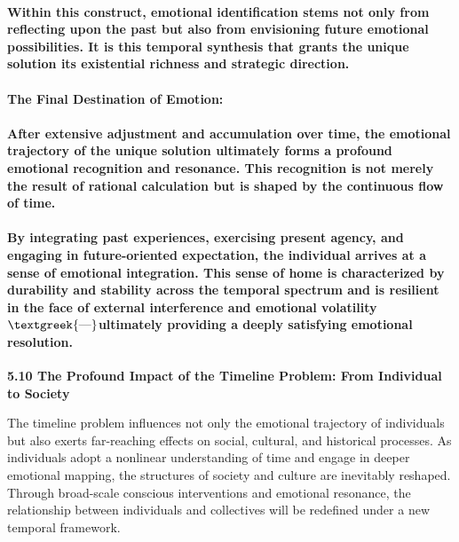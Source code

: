 \documentclass[a4paper]{article}
\begin{document}
\paragraph{Within this construct, emotional identification stems not only from reflecting upon the past but also from
envisioning future emotional possibilities. It is this temporal synthesis that grants the unique solution its
existential richness and strategic direction.}
\paragraph[The Final Destination of Emotion:]{\textbf{The Final Destination of Emotion:}}
\paragraph{After extensive adjustment and accumulation over time, the emotional trajectory of the unique solution
ultimately forms a profound emotional recognition and resonance. This recognition is not merely the result of rational
calculation but is shaped by the continuous flow of time.}
\paragraph[By integrating past experiences, exercising present agency, and engaging in future{}-oriented expectation,
the individual arrives at a sense of emotional integration. This sense of home is characterized by durability and
stability across the temporal spectrum and is resilient in the face of external interference and emotional
volatility$\text{\textgreek{—}}$ultimately providing a deeply satisfying emotional resolution.]{By integrating past
experiences, exercising present agency, and engaging in future-oriented expectation, the individual arrives at a sense
of emotional integration. This sense of home is characterized by durability and stability across the temporal spectrum
and is resilient in the face of external interference and emotional volatility$\text{\textgreek{—}}$ultimately
providing a deeply satisfying emotional resolution.}
\textbf{5.10 The Profound Impact of the Timeline Problem: From Individual to Society}

The timeline problem influences not only the emotional trajectory of individuals but also exerts far-reaching effects on
social, cultural, and historical processes. As individuals adopt a nonlinear understanding of time and engage in deeper
emotional mapping, the structures of society and culture are inevitably reshaped. Through broad-scale conscious
interventions and emotional resonance, the relationship between individuals and collectives will be redefined under a
new temporal framework.
\end{document}
